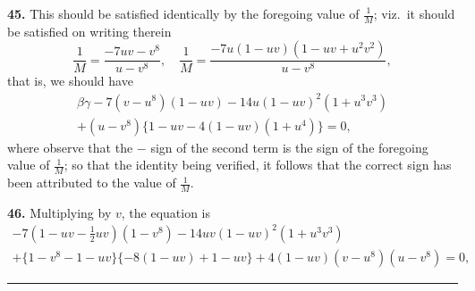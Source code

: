 \documentclass[11pt,a4paper]{article}
\theoremstyle{plain}
\begin{document}
\medskip
\noindent\textbf{45.} This should be satisfied identically by the foregoing value of $\frac{1}{M}$; viz.\ it should be satisfied on writing therein
\[
\frac{1}{M} = \frac{-7uv - v^8}{u - v^8}, \quad \frac{1}{M} = \frac{-7u(1 - uv)(1 - uv + u^2v^2)}{u - v^8},
\]
that is, we should have
\begin{multline*}
\beta\gamma - 7(v - u^8)(1 - uv) - 14u(1 - uv)^2(1 + u^3v^3) \\
+ (u - v^8)\{1 - uv - 4(1 - uv)(1 + u^4)\} = 0,
\end{multline*}
where observe that the $-$ sign of the second term is the sign of the foregoing value of $\frac{1}{M}$; so that the identity being verified, it follows that the correct sign has been attributed to the value of $\frac{1}{M}$.

\medskip
\noindent\textbf{46.} Multiplying by $v$, the equation is
\begin{multline*}
-7(1 - uv - \tfrac{1}{2}uv)(1 - v^8) - 14uv(1 - uv)^2(1 + u^3v^3) \\
+ \{1 - v^8 - 1 - uv\}\{-8(1 - uv) + 1 - uv\} + 4(1 - uv)(v - u^8)(u - v^8) = 0,
\end{multline*}


\vspace{2em}
\begin{center}
\rule{0.5\textwidth}{0.4pt}
\end{center}
\end{document}
